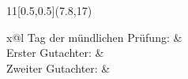 \begin{titlepage}
	\begin{textblock}{11}[0.5,0.5](7.8,17)
	\sffamily%
	\raggedright%
	\setlength{\tabcolsep}{0pt}
		\begin{tabularx}{\columnwidth}{x@{\extracolsep{20pt}}l}
			Tag der mündlichen Prüfung: & \ExamDate\texorpdfstring{\\}{}
			Erster Gutachter: & \MainAdvisor\texorpdfstring{\\}{}
			Zweiter Gutachter: & \CoAdvisor\texorpdfstring{\\}{}
		\end{tabularx}
 	\end{textblock}
	
\end{titlepage}
